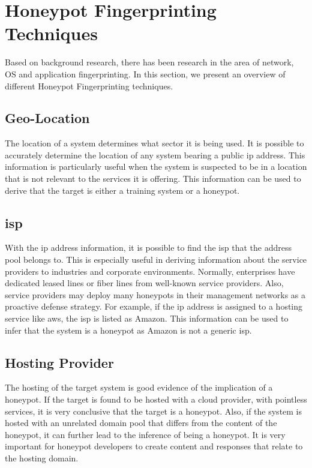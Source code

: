 \section{Honeypot Fingerprinting Techniques}
\label{sec:hft}

Based on background research, there has been research in the area of network, OS and application fingerprinting. In this section, we present an overview of different Honeypot Fingerprinting techniques. 

\subsection{Geo-Location}
The location of a system determines what sector it is being used. It is possible to accurately determine the location of any system bearing a public \acrshort{ip} address. This information is particularly useful when the system is suspected to be in a location that is not relevant to the services it is offering. This information can be used to derive that the target is either a training system or a honeypot. 

\subsection{\acrfull{isp}}
With the \acrshort{ip} address information, it is possible to find the \acrshort{isp} that the address pool belongs to. This is especially useful in deriving information about the service providers to industries and corporate environments. Normally, enterprises have dedicated leased lines or fiber lines from well-known service providers. Also, service providers may deploy many honeypots in their management networks as a proactive defense strategy. For example, if the \acrshort{ip} address is assigned to a hosting service like \acrshort{aws}, the \acrshort{isp} is listed as Amazon. This information can be used to infer that the system is a honeypot as Amazon is not a generic \acrshort{isp}. 

\subsection{Hosting Provider}
The hosting of the target system is good evidence of the implication of a honeypot. If the target is found to be hosted with a cloud provider, with pointless services, it is very conclusive that the target is a honeypot. Also, if the system is hosted with an unrelated domain pool that differs from the content of the honeypot, it can further lead to the inference of being a honeypot. It is very important for honeypot developers to create content and responses that relate to the hosting domain. 

